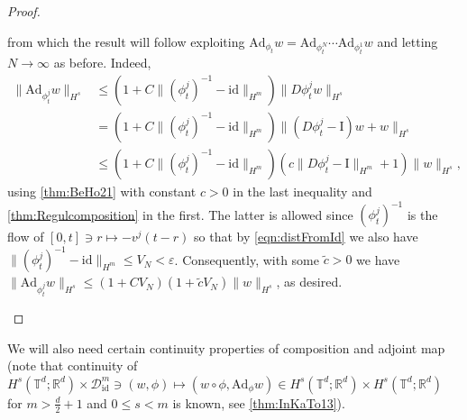 \documentclass[a4paper, 12pt]{article}
\newcommand{\R}{\mathbb{R}}
\newcommand{\T}{\mathbb{T}}
\newcommand{\id}{\mathrm{id}}
\newcommand{\DiffSobId}{\mathcal D_{\id}}
\newcommand{\onesymbol}{\mathrm{I}}
\newcommand{\adjointMap}{\mathrm{Ad}}
\begin{document}
\begin{proof}
\begin{enumerate}
from which the result will follow exploiting $\adjointMap_{\phi_t}w=\adjointMap_{\phi_t^N}\cdots\adjointMap_{\phi_t^1}w$ and letting $N\to\infty$ as before. Indeed,
\begin{align*}
\|\adjointMap_{\phi_t^j}w\|_{H^s}
&\leq(1+C\|(\phi_t^j)^{-1}-\id\|_{H^m})\|D\phi_t^jw\|_{H^s}\\
&=(1+C\|(\phi_t^j)^{-1}-\id\|_{H^m})\|(D\phi_t^j-\onesymbol)w+w\|_{H^s}\\
&\leq(1+C\|(\phi_t^j)^{-1}-\id\|_{H^m})(c\|D\phi_t^j-\onesymbol\|_{H^m}+1)\|w\|_{H^s},
\end{align*}
using \cref{thm:BeHo21} with constant $c>0$ in the last inequality and \cref{thm:Regulcomposition} in the first.
The latter is allowed since $(\phi_t^j)^{-1}$ is the flow of $[0,t]\ni r\mapsto-v^j(t-r)$ \cite{Tr95a} so that by \eqref{eqn:distFromId} we also have $\|(\phi_t^j)^{-1}-\id\|_{H^m}\leq V_N<\varepsilon$.
Consequently, with some $\tilde c>0$ we have $\|\adjointMap_{\phi_t^j}w\|_{H^s}\leq(1+CV_N)(1+\tilde cV_N)\|w\|_{H^s}$, as desired.
\qedhere
\end{enumerate}
\end{proof}

We will also need certain continuity properties of composition and adjoint map
(note that continuity of $H^s(\T^d;\R^d)\times\DiffSobId^m\ni(w,\phi)\mapsto(w\circ\phi,\adjointMap_\phi w)\in H^s(\T^d;\R^d)\times H^s(\T^d;\R^d)$ for $m>\frac d2+1$ and $0\leq s<m$ is known, see \cref{thm:InKaTo13}).
\end{document}
